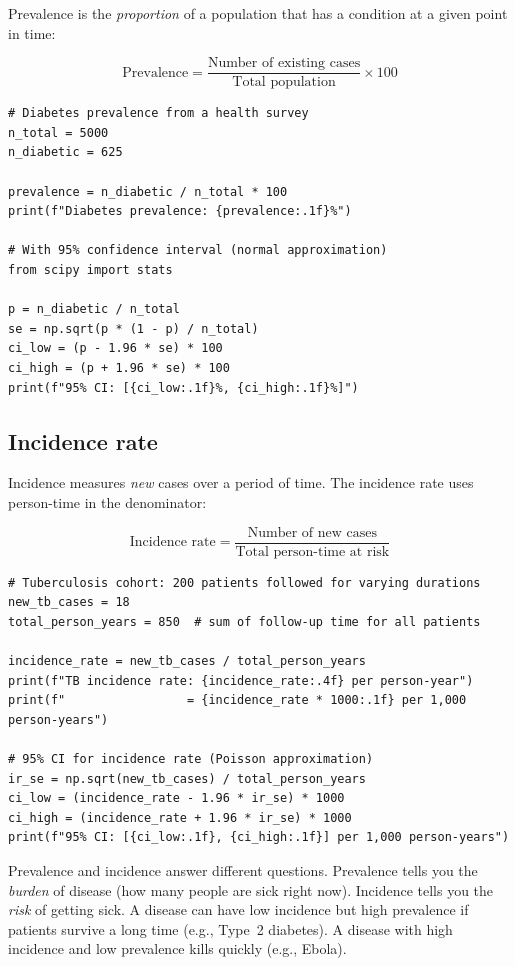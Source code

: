 Prevalence is the \emph{proportion} of a population that has a condition at a given point in time:

\[
\text{Prevalence} = \frac{\text{Number of existing cases}}{\text{Total population}} \times 100
\]

\begin{verbatim}
# Diabetes prevalence from a health survey
n_total = 5000
n_diabetic = 625

prevalence = n_diabetic / n_total * 100
print(f"Diabetes prevalence: {prevalence:.1f}%")

# With 95% confidence interval (normal approximation)
from scipy import stats

p = n_diabetic / n_total
se = np.sqrt(p * (1 - p) / n_total)
ci_low = (p - 1.96 * se) * 100
ci_high = (p + 1.96 * se) * 100
print(f"95% CI: [{ci_low:.1f}%, {ci_high:.1f}%]")
\end{verbatim}

\subsection{Incidence rate}

Incidence measures \emph{new} cases over a period of time. The incidence rate uses person-time in the denominator:

\[
\text{Incidence rate} = \frac{\text{Number of new cases}}{\text{Total person-time at risk}}
\]

\begin{verbatim}
# Tuberculosis cohort: 200 patients followed for varying durations
new_tb_cases = 18
total_person_years = 850  # sum of follow-up time for all patients

incidence_rate = new_tb_cases / total_person_years
print(f"TB incidence rate: {incidence_rate:.4f} per person-year")
print(f"                 = {incidence_rate * 1000:.1f} per 1,000 person-years")

# 95% CI for incidence rate (Poisson approximation)
ir_se = np.sqrt(new_tb_cases) / total_person_years
ci_low = (incidence_rate - 1.96 * ir_se) * 1000
ci_high = (incidence_rate + 1.96 * ir_se) * 1000
print(f"95% CI: [{ci_low:.1f}, {ci_high:.1f}] per 1,000 person-years")
\end{verbatim}

\begin{warningbox}
Prevalence and incidence answer different questions. Prevalence tells you the \emph{burden} of disease (how many people are sick right now). Incidence tells you the \emph{risk} of getting sick. A disease can have low incidence but high prevalence if patients survive a long time (e.g., Type~2 diabetes). A disease with high incidence and low prevalence kills quickly (e.g., Ebola).
\end{warningbox}

